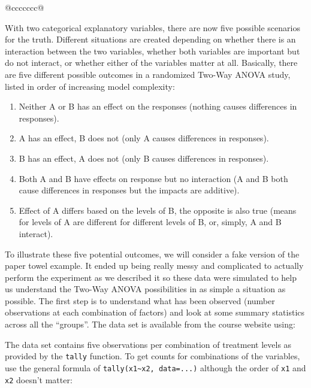 \documentclass[]{book}
\newenvironment{Shaded}{\begin{snugshade}}{\end{snugshade}}
\newcommand{\KeywordTok}[1]{\textcolor[rgb]{0.13,0.29,0.53}{\textbf{#1}}}
\newcommand{\StringTok}[1]{\textcolor[rgb]{0.31,0.60,0.02}{#1}}
\newcommand{\OperatorTok}[1]{\textcolor[rgb]{0.81,0.36,0.00}{\textbf{#1}}}
\newcommand{\NormalTok}[1]{#1}
\theoremstyle{definition}
\theoremstyle{definition}
\theoremstyle{remark}
\begin{document}
\begin{longtable}[]{@{}ccccccc@{}}
\begin{minipage}[b]{0.10\columnwidth}
With two categorical explanatory variables, there are now five possible
scenarios for the truth. Different situations are created depending on
whether there is an interaction between the two variables, whether both
variables are important but do not interact, or whether either of the
variables matter at all. Basically, there are five different possible
outcomes in a randomized Two-Way ANOVA study, listed in order of
increasing model complexity:

\begin{enumerate}
\def\labelenumi{\arabic{enumi}.}
\item
  Neither A or B has an effect on the responses (nothing causes
  differences in responses).
\item
  A has an effect, B does not (only A causes differences in responses).
\item
  B has an effect, A does not (only B causes differences in responses).
\item
  Both A and B have effects on response but no interaction (A and B both
  cause differences in responses but the impacts are additive).
\item
  Effect of A differs based on the levels of B, the opposite is also
  true (means for levels of A are different for different levels of B,
  or, simply, A and B interact).
\end{enumerate}

To illustrate these five potential outcomes, we will consider a fake
version of the paper towel example. It ended up being really messy and
complicated to actually perform the experiment as we described it so
these data were simulated to help us understand the Two-Way ANOVA
possibilities in as simple a situation as possible. The first step is to
understand what has been observed (number observations at each
combination of factors) and look at some summary statistics across all
the ``groups''. The data set is available from the course website using:

\begin{Shaded}
\end{Shaded}

The data set contains five observations per combination of treatment
levels as provided by the \texttt{tally} function. To get counts for
combinations of the variables, use the general formula of
\texttt{tally(x1\textasciitilde{}x2,\ data=...)} although the order of
\texttt{x1} and \texttt{x2} doesn't matter:


\end{minipage}
\end{longtable}
\end{document}
